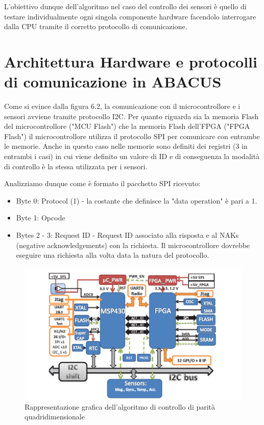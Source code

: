 \documentclass[LaM,binding=0.6cm,oneside]{../sapthesis}
\begin{document}
L’obiettivo dunque dell’algoritmo nel caso del controllo dei sensori è quello di testare individualmente ogni singola componente hardware facendolo interrogare dalla CPU tramite il corretto protocollo di comunicazione.


\section{Architettura Hardware e protocolli di comunicazione in ABACUS}

Come si evince dalla figura 6.2, la comunicazione con il microcontrollore e i sensori avviene tramite protocollo I2C.
Per quanto riguarda sia la memoria Flash del microcontrollore ("MCU Flash") che la memoria Flash dell'FPGA ("FPGA Flash") il microcontrollore utilizza il protocollo SPI per comunicare con entrambe le memorie. Anche in questo caso nelle memorie sono definiti dei registri (3 in entrambi i casi) in cui viene definito un valore di ID e di conseguenza la modalità di controllo è la stessa utilizzata per i sensori.

Analizziamo dunque come è formato il pacchetto SPI ricevuto:
\begin{itemize}
    \item Byte 0: Protocol (1) - la costante che definisce la "data  operation" è pari a 1.
    
    \item Byte 1: Opcode
    
    \item Bytes 2 - 3: Request ID - Request ID associato alla risposta e al NAKs (negative acknowledgements) con la richiesta. Il microcontrollore dovrebbe eseguire una richiesta alla volta data la natura del protocollo.
\end{itemize}
    

\begin{figure}[htbp]
\centerline{\includegraphics[scale=0.6]{examples/ABACUS_overview.png}}
\caption{Rappresentazione grafica dell'algoritmo di controllo di parità quadridimensionale}
\label{fig}
\end{figure}
\vspace{0.5cm}
\end{document}

